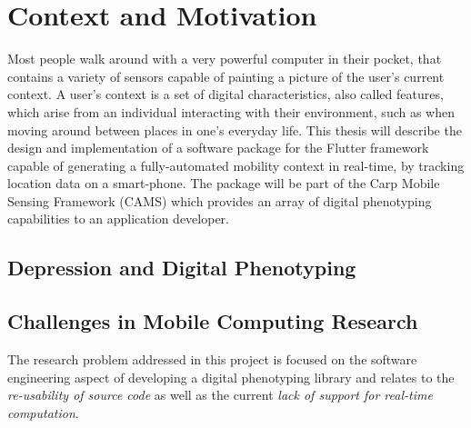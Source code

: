 \section{Context and Motivation}


Most people walk around with a very powerful computer in their pocket, that contains a variety of sensors capable of painting a picture of the user's current context. A user's context is a set of digital characteristics, also called features, which arise from an individual interacting with their environment, such as when moving around between places in one's everyday life. This thesis will describe the design and implementation of a software package for the Flutter framework capable of generating a fully-automated mobility context in real-time, by tracking location data on a smart-phone. The package will be part of the Carp Mobile Sensing Framework (CAMS) which provides an array of digital phenotyping capabilities to an application developer.\\

\subsection{Depression and Digital Phenotyping}


\subsection{Challenges in Mobile Computing Research}
The research problem addressed in this project is focused on the software engineering aspect of developing a digital phenotyping library and relates to the \textit{re-usability of source code} as well as the current \textit{lack of support for real-time computation}. 

